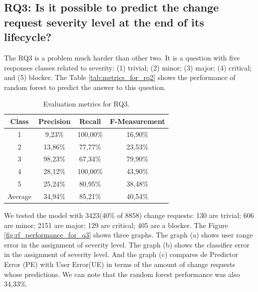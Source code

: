 \documentclass[10pt, conference]{IEEEtran}
\begin{document}
\subsection{RQ3: Is it possible to predict the change request severity level at the end of its lifecycle?}

The RQ3 is a problem much harder than other two. It is a question with five responses classes related to severity: (1) trivial; (2) minor; (3) major; (4) critical; and (5) blocker. The Table \ref{tab:metrics_for_rq2} shows the performance of random forest to predict the answer to this question. 


\begin{table}[!ht]
	\renewcommand{\arraystretch}{1.3}
	\caption{Evaluation metrics for RQ3.}
	\label{tab:metrics_for_rq3}
	\centering
	\begin{tabular}{|c|c|c|c|}
		\hline
		Class & Precision & Recall & F-Measurement\\
		\hline
		1 & 9,23\% & 100,00\% & 16,90\%\\
		\hline
		2 & 13,86\% & 77,77\% & 23,53\%\\
		\hline
		3 & 98,23\% & 67,34\% & 79,90\%\\
		\hline
		4 & 28,12\% & 100,00\% & 43,90\%\\
		\hline
		5 & 25,24\% & 80,95\% & 38,48\%\\
		\hline\hline 
		Average & 34,94\% & 85,21\% & 40,54\% \\
		\hline 
	\end{tabular}
\end{table}


We tested the model with 3423(40\% of 8858) change requests: 130 are trivial; 606 are minor; 2151 are major; 129 are critical; 405 are a blocker. The Figure \ref{fig:rf_performance_for_q3} shows three graphs. The graph (a) shows user range error in the assignment of severity level. The graph (b) shows the classifier error in the assignment of severity level. And the graph (c) compares de Predictor Error (PE) with User Error(UE) in terms of the amount of change requests whose predictions. We can note that the random forest performance was also 34,33\%.
\end{document}
